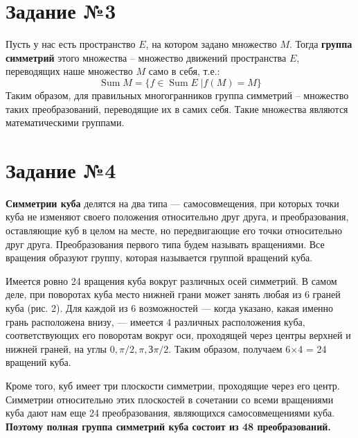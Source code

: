 \documentclass[12pt]{article}
\DeclareMathOperator{\Sum}{\mathop{Sum}}
\begin{document}
\newpage
\section{Задание №3}
Пусть у нас есть пространство $ E $, на котором задано множество $ M $. Тогда \textbf{группа симметрий} этого множества -- множество движений пространства $ E $, переводящих наше множество $ M $ само в себя, т.е.:
\begin{equation}
\Sum M = \{ f \in \Sum E \; | f(M) = M\}
\end{equation}
Таким образом, для правильных многогранников группа симметрий -- множество таких преобразований, переводящие их в самих себя. Такие множества являются математическими группами.

\section{Задание №4}
\textbf{Симметрии куба} делятся на два типа — самосовмещения, при которых точки куба не изменяют своего положения относительно друг друга, и преобразования, оставляющие куб в целом на месте, но передвигающие его точки относительно друг друга. Преобразования первого типа будем называть вращениями. Все вращения образуют группу, которая называется группой
вращений куба.

Имеется ровно 24 вращения куба вокруг различных осей симметрий. В самом деле, при поворотах куба место нижней грани может занять
любая из 6 граней куба (рис. 2). Для каждой из 6 возможностей — когда указано, какая именно грань расположена внизу, — имеется 4 различных расположения куба, соответствующих его поворотам вокруг оси, проходящей через центры верхней и нижней граней, на углы $ 0, \pi/2, \pi, З\pi/2 $. Таким образом, получаем 6×4 = 24 вращений куба. 

Кроме того, куб имеет три плоскости симметрии, проходящие через его центр. Симметрии относительно этих плоскостей в сочетании со всеми вращениями куба дают нам еще 24 преобразования, являющихся самосовмещениями куба. \textbf{Поэтому полная группа симметрий куба состоит из 48 преобразований.}
\end{document}
